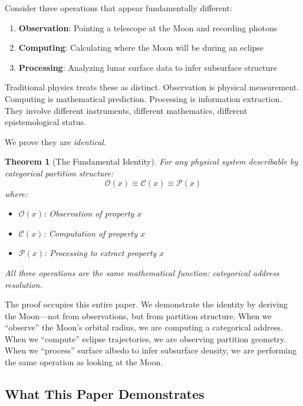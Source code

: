 \documentclass[twocolumn,10pt]{article}
\newtheorem{theorem}{Theorem}[section]
\theoremstyle{definition}
\theoremstyle{remark}
\newcommand{\Obs}{\mathcal{O}}
\newcommand{\Comp}{\mathcal{C}}
\newcommand{\Proc}{\mathcal{P}}
\begin{document}
Consider three operations that appear fundamentally different:

\begin{enumerate}
    \item \textbf{Observation}: Pointing a telescope at the Moon and recording photons
    \item \textbf{Computing}: Calculating where the Moon will be during an eclipse
    \item \textbf{Processing}: Analyzing lunar surface data to infer subsurface structure
\end{enumerate}

Traditional physics treats these as distinct. Observation is physical measurement. Computing is mathematical prediction. Processing is information extraction. They involve different instruments, different mathematics, different epistemological status.

We prove they are \emph{identical}.

\begin{theorem}[The Fundamental Identity]
\label{thm:fundamental}
For any physical system describable by categorical partition structure:
\begin{equation}
\boxed{\Obs(x) \equiv \Comp(x) \equiv \Proc(x)}
\end{equation}
where:
\begin{itemize}
    \item $\Obs(x)$: Observation of property $x$
    \item $\Comp(x)$: Computation of property $x$
    \item $\Proc(x)$: Processing to extract property $x$
\end{itemize}
All three operations are the same mathematical function: categorical address resolution.
\end{theorem}

The proof occupies this entire paper. We demonstrate the identity by deriving the Moon---not from observations, but from partition structure. When we ``observe'' the Moon's orbital radius, we are computing a categorical address. When we ``compute'' eclipse trajectories, we are observing partition geometry. When we ``process'' surface albedo to infer subsurface density, we are performing the same operation as looking at the Moon.

\subsection{What This Paper Demonstrates}
\end{document}
